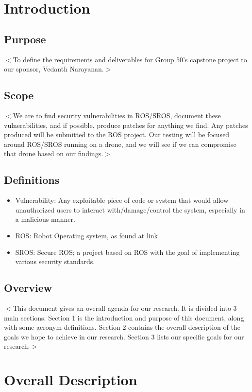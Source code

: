 \documentclass{scrreprt}
\begin{document}
\chapter{Introduction}

\section{Purpose}
$<$To define the requirements and deliverables for Group 50's capstone project to our sponsor, Vedanth Narayanan.$>$

\section{Scope}
$<$We are to find security vulnerabilities in ROS/SROS, document these vulnerabilities, and if possible, produce patches for anything we find. Any patches produced will be submitted to the ROS project. Our testing will be focused around ROS/SROS running on a drone, and we will see if we can compromise that drone based on our findings.$>$

\section{Definitions}
\begin{itemize}
  \item Vulnerability: Any exploitable piece of code or system that would allow unauthorized users to interact with/damage/control the system, especially in a malicious manner.
  \item ROS: Robot Operating system, as found at link
  \item SROS: Secure ROS; a project based on ROS with the goal of implementing various security standards.
\end{itemize}

\section{Overview}
$<$This document gives an overall agenda for our research. It is divided into 3 main sections:
Section 1 is the introduction and purpose of this document, along with some acronym definitions.
Section 2 contains the overall description of the goals we hope to achieve in our research.
Section 3 lists our specific goals for our research.$>$


\chapter{Overall Description}
\end{document}
